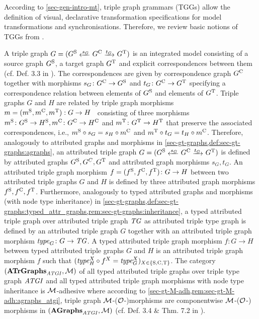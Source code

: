 According to \cref{sec-gen-intro-mt}, triple graph grammars (TGGs) allow the definition of visual, declarative transformation specifications for model transformations and synchronisations.
Therefore, we review basic notions of TGGs from \cite{FAGT2}.

A triple graph $G=(G^\SRC \transB{s_G} G^\C \trans{t_G} G^\T)$ is an integrated model consisting of a source graph $G^\mathrm{S}$, a target graph $G^\mathrm{T}$ and explicit correspondences between them (cf. Def. 3.3 in \cite{FAGT2}).
The correspondences are given by correspondence graph $G^\mathrm{C}$ together with morphisms $s_G\colon G^\mathrm{C} \to G^\mathrm{S}$ and $t_G\colon G^\mathrm{C} \to G^\mathrm{T}$ specifying a correspondence relation between elements of $G^\mathrm{S}$ and elements of $G^\mathrm{T}$.
Triple graphs $G$ and $H$ are related by triple graph morphisms $m=(m^\mathrm{S},m^\mathrm{C},m^\mathrm{T}) : G \rightarrow H$~\cite{DBLP:conf/wg/Schurr94,DBLP:conf/fase/EhrigEEHT07} consisting of three morphisms $m^\mathrm{S}\colon G^\mathrm{S} \to H^\mathrm{S},m^\mathrm{C}\colon G^\mathrm{C} \to H^\mathrm{C}$ and $m^\mathrm{T}\colon G^\mathrm{T} \to H^\mathrm{T}$ that preserve the associated correspondences, i.e., $m^\mathrm{S} \circ s_G=s_H \circ m^\mathrm{C}$ and $m^\mathrm{T} \circ t_G=t_H \circ m^\mathrm{C}$.  
Therefore, analogously to attributed graphs and morphisms in \cref{sec-gt-graphs,def:sec-gt-graphs:agraphs}, an attributed triple graph $G=(G^\SRC \transB{s_G} G^\C \trans{t_G} G^\T)$ is defined by attributed graphs $G^\mathrm{S},G^C,G^\mathrm{T}$ and attributed graph morphisms $s_G,t_G$.
An attributed triple graph morphism $f=(f^\mathrm{S},f^\mathrm{C},f^\mathrm{T})\colon G \rightarrow H$ between two attributed triple graphs $G$ and $H$ is defined by three attributed graph morphisms $f^\mathrm{S},f^\mathrm{C},f^\mathrm{T}$.
Furthermore, analogously to typed attributed graphs and morphisms (with node type inheritance) in \cref{sec-gt-graphs,def:sec-gt-graphs:typed_attr_graphs,rem:sec-gt-graphs:inheritance}, a typed attributed triple graph over attributed triple graph $\mathit{TG}$ as attributed triple type graph is defined by an attributed triple graph $G$ together with an attributed triple graph morphism $\mathit{type}_G\colon G \to \mathit{TG}$.
A typed attributed triple graph morphism $f\colon G \rightarrow H$ between typed attributed triple graphs $G$ and $H$ is an attributed triple graph morphism $f$ such that $(\mathit{type}_H^X \circ f^X=\mathit{type}_G^X)_{X \in \{\mathrm{S},\mathrm{C},\mathrm{T}\}}$.
The category $(\mathbf{ATrGraphs}_\mathit{ATGI},{\cal M})$ of all typed attributed triple graphs over triple type graph $\mathit{ATGI}$ and all typed attributed triple graph morphisms with node type inheritance is ${\cal M}$-adhesive where according to \cref{sec-gt-M-adh,rem:sec-gt-M-adh:agraphs_atgi}, triple graph ${\cal M}$-(${\cal O}$-)morphisms are componentwise ${\cal M}$-(${\cal O}$-) morphisms in $(\mathbf{AGraphs}_\mathit{ATGI},{\cal M})$ (cf. Def. 3.4 \& Thm. 7.2 in \cite{FAGT2}).
